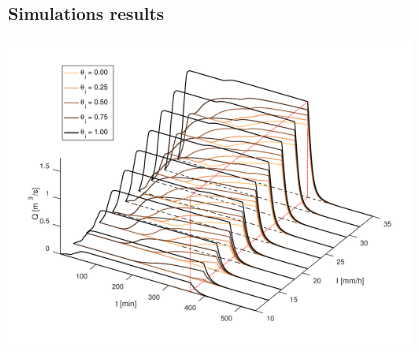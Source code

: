 \documentclass[xcolor=dvipsnames, USenglish]{beamer}  %
\begin{document}
  \begin{frame}
    \frametitle{Simulations results}
    \centering    
    \includegraphics[width=0.8\textwidth]{img/hydrographs3d.png}
  \end{frame}
\end{document}

